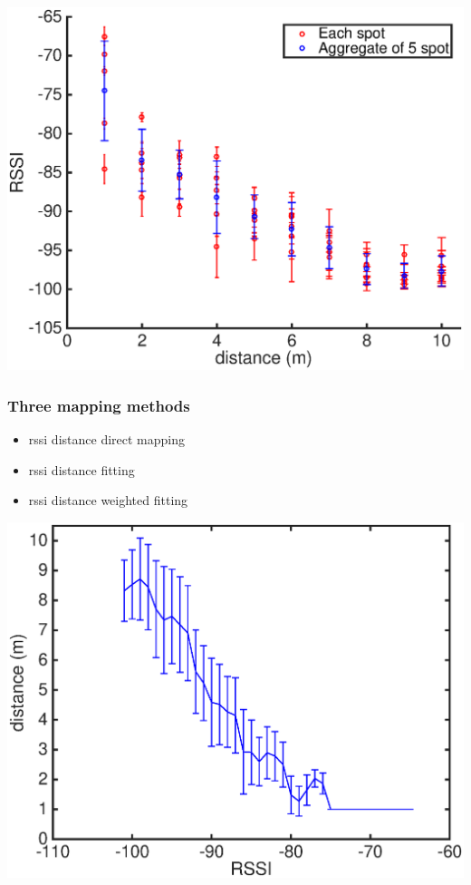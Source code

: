 \documentclass[11pt]{beamer}
\author{Hong Xiong}
\begin{document}

\begin{frame}
\includegraphics[width=\textwidth]{outdoor_dis_vs_RSSI_5_spot.eps} 
\end{frame}


\begin{frame}
\frametitle{Three mapping methods}
\begin{itemize}
\item rssi distance direct mapping
\item rssi distance fitting
\item rssi distance weighted fitting
\end{itemize}
\end{frame}

\begin{frame}
\includegraphics[width=\textwidth]{outdoor_RSSI_vs_dis.eps} 
\end{frame}
\end{document}
